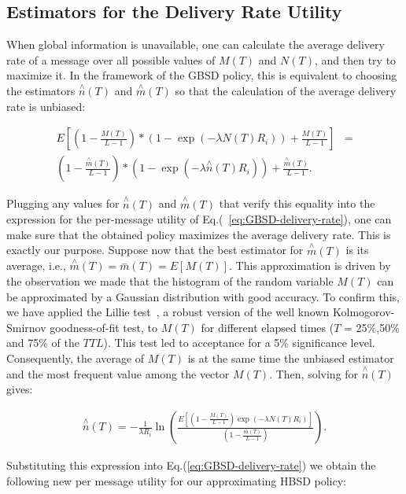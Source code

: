 \subsection{Estimators for the Delivery Rate Utility}
\label{sec:learning:EDR}

When global information is unavailable, one can calculate the average delivery rate of a message over all possible values of
$M(T)$ and $N(T)$, and then try to maximize it. In the framework of the GBSD policy, this is equivalent to choosing the estimators $\stackrel{\wedge}{n}(T)$ and $\stackrel{\wedge}{m}(T)$ so that the calculation of the average delivery rate is unbiased:

\begin{align*}
E[(1 - \frac{M(T)}{L-1})*(1 -\exp(-\lambda N(T) R_i
))+\frac{M(T)}{L-1}]&=
\\(1 -
\frac{\stackrel{\wedge}{m}(T)}{L-1})*(1 -\exp(-\lambda
\stackrel{\wedge}{n}(T) R_i
))+\frac{\stackrel{\wedge}{m}(T)}{L-1}.
\end{align*}

Plugging any values for $\stackrel{\wedge}{n}(T)$ and $\stackrel{\wedge}{m}(T)$ that verify this equality into the expression for the per-message utility of Eq.(~\ref{eq:GBSD-delivery-rate}), one can make sure that the obtained policy maximizes the average delivery rate. This is exactly our purpose. Suppose now that the best estimator for $\stackrel{\wedge}{m}(T)$ is its average, i.e., $\stackrel{\wedge}{m}(T)=\stackrel{-}{m}(T)=E[M(T)]$. This approximation is driven by the observation we made that the histogram of the random variable $M(T)$ can be  approximated by a Gaussian distribution with good accuracy. To confirm this, we have applied the Lillie test~\cite{LillieTest}, a robust version of the well known Kolmogorov-Smirnov goodness-of-fit test, to $M(T)$ for different elapsed times ($T$ = 25\%,50\% and 75\% of the $TTL$). This test led to acceptance for a 5\% significance level. Consequently, the average of $M(T)$ is at the same time the unbiased estimator and the most frequent value among the vector $M(T)$. Then, solving for $\stackrel{\wedge}{n}(T)$ gives:

\begin{align}
\stackrel{\wedge}{n}(T) = -\frac{1}{\lambda R_i}
\ln(\frac{E[(1-\frac{M(T)}{L-1})\exp(-\lambda N(T)
R_i)]}{(1-\frac{\stackrel{-}{m}(T)}{L-1})}).
\end{align}

Substituting this expression into Eq.(\ref{eq:GBSD-delivery-rate}) we obtain the following new per message utility for our approximating HBSD policy:

